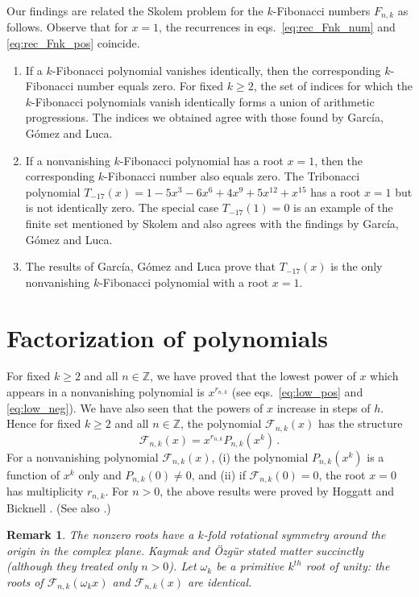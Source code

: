 \documentclass[review]{elsarticle}
\theoremstyle{plain}
\newtheorem{remark}[theorem]{Remark}
\begin{document}
Our findings are related the Skolem problem for the $k$-Fibonacci numbers $F_{n,k}$ as follows.
Observe that for $x=1$, the recurrences in eqs.~\eqref{eq:rec_Fnk_num} and \eqref{eq:rec_Fnk_pos} coincide.
\begin{enumerate}
\item
If a $k$-Fibonacci polynomial vanishes identically, then the corresponding $k$-Fibonacci number equals zero.
For fixed $k\ge2$, the set of indices for which the $k$-Fibonacci polynomials vanish identically forms a union of arithmetic progressions.
The indices we obtained agree with those found by Garc{\'i}a, G{\'o}mez and Luca.
\item
If a nonvanishing $k$-Fibonacci polynomial has a root $x=1$, then the corresponding $k$-Fibonacci number also equals zero.
The Tribonacci polynomial $T_{-17}(x) = 1 -5x^3 -6x^6 +4x^9 +5x^{12} +x^{15}$ has a root $x=1$ but is not identically zero.
The special case $T_{-17}(1)=0$ is an example of the finite set mentioned by Skolem
and also agrees with the findings by Garc{\'i}a, G{\'o}mez and Luca.
\item
The results of Garc{\'i}a, G{\'o}mez and Luca prove that $T_{-17}(x)$ is the only nonvanishing $k$-Fibonacci polynomial with a root $x=1$.
\end{enumerate}

\setcounter{equation}{0}
\section{Factorization of polynomials}\label{sec:poly_fac}
For fixed $k\ge2$ and all $n\in\mathbb{Z}$, we have proved that the
lowest power of $x$ which appears in a nonvanishing polynomial is $x^{r_{n,k}}$
(see eqs.~\eqref{eq:low_pos} and \eqref{eq:low_neg}).
We have also seen that the powers of $x$ increase in steps of $h$.
Hence for fixed $k\ge2$ and all $n\in\mathbb{Z}$, 
the polynomial $\mathcal{F}_{n,k}(x)$ has the structure
\begin{equation}  
\label{eq:structpoly}
\mathcal{F}_{n,k}(x) = x^{r_{n,k}} P_{n,k}(x^k) \,.
\end{equation}
For a nonvanishing polynomial $\mathcal{F}_{n,k}(x)$,
(i) the polynomial $P_{n,k}(x^k)$ is a function of $x^k$ only and $P_{n,k}(0) \ne 0$,
and (ii) if $\mathcal{F}_{n,k}(0)=0$, the root $x=0$ has multiplicity $r_{n,k}$.
For $n>0$, the above results were proved by Hoggatt and Bicknell \cite{HoggattBicknell_FibGen}.
(See also \cite{HeSimonRicci_num}.)
\begin{remark}
The nonzero roots have a $k$-fold rotational symmetry around the origin in the complex plane.
Kaymak and {\"O}zg{\"u}r \cite{Kaymak_Ozgur} stated matter succinctly (although they treated only $n>0$).
Let $\omega_k$ be a primitive $k^{th}$ root of unity:
the roots of $\mathcal{F}_{n,k}(\omega_kx)$ and $\mathcal{F}_{n,k}(x)$ are identical.
\end{remark}
\end{document}
